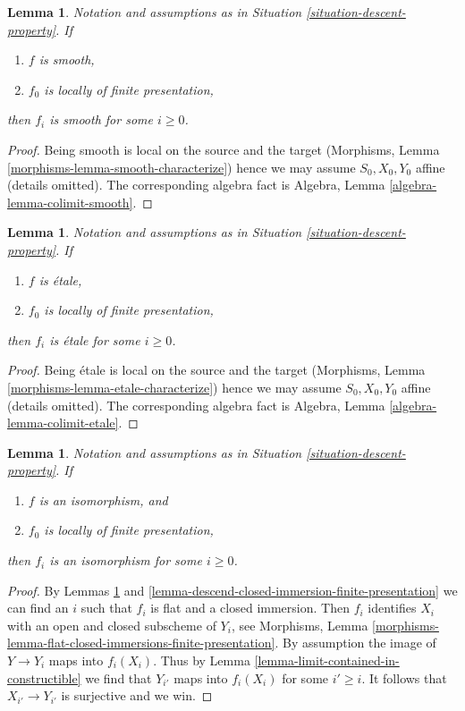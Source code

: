 \documentclass{stacks-project}
\theoremstyle{plain}
\newtheorem{lemma}[subsection]{Lemma}
\theoremstyle{definition}
\theoremstyle{remark}
\numberwithin{equation}{subsection}
\begin{document}
\begin{lemma}
\label{lemma-descend-smooth}
Notation and assumptions as in Situation \ref{situation-descent-property}.
If
\begin{enumerate}
\item $f$ is smooth,
\item $f_0$ is locally of finite presentation,
\end{enumerate}
then $f_i$ is smooth for some $i \geq 0$.
\end{lemma}

\begin{proof}
Being smooth is local on the source and the target (Morphisms,
Lemma \ref{morphisms-lemma-smooth-characterize}) hence we may assume
$S_0, X_0, Y_0$ affine (details omitted). The corresponding algebra fact is
Algebra, Lemma \ref{algebra-lemma-colimit-smooth}.
\end{proof}

\begin{lemma}
\label{lemma-descend-etale}
Notation and assumptions as in Situation \ref{situation-descent-property}.
If
\begin{enumerate}
\item $f$ is \'etale,
\item $f_0$ is locally of finite presentation,
\end{enumerate}
then $f_i$ is \'etale for some $i \geq 0$.
\end{lemma}

\begin{proof}
Being \'etale is local on the source and the target (Morphisms,
Lemma \ref{morphisms-lemma-etale-characterize}) hence we may assume
$S_0, X_0, Y_0$ affine (details omitted). The corresponding algebra fact is
Algebra, Lemma \ref{algebra-lemma-colimit-etale}.
\end{proof}

\begin{lemma}
\label{lemma-descend-isomorphism}
Notation and assumptions as in Situation \ref{situation-descent-property}.
If
\begin{enumerate}
\item $f$ is an isomorphism, and
\item $f_0$ is locally of finite presentation,
\end{enumerate}
then $f_i$ is an isomorphism for some $i \geq 0$.
\end{lemma}

\begin{proof}
By Lemmas \ref{lemma-descend-etale} and
\ref{lemma-descend-closed-immersion-finite-presentation}
we can find an $i$ such that $f_i$ is flat and a closed immersion.
Then $f_i$ identifies $X_i$ with an open and closed subscheme of
$Y_i$, see Morphisms, Lemma
\ref{morphisms-lemma-flat-closed-immersions-finite-presentation}.
By assumption the image of $Y \to Y_i$ maps into $f_i(X_i)$.
Thus by Lemma \ref{lemma-limit-contained-in-constructible}
we find that $Y_{i'}$ maps into $f_i(X_i)$ for some $i' \geq i$.
It follows that $X_{i'} \to Y_{i'}$ is surjective and we win.
\end{proof}
\end{document}
